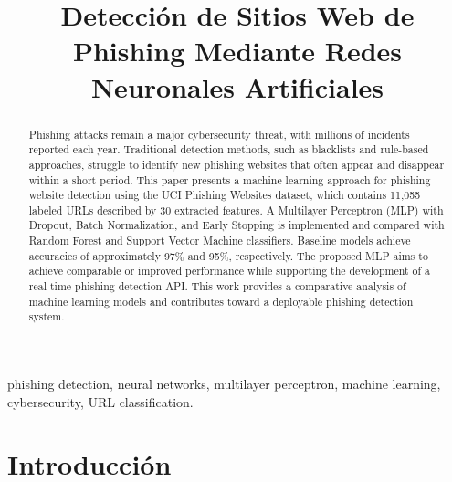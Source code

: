 \documentclass[conference]{IEEEtran}
\begin{document}
\title{Detección de Sitios Web de Phishing Mediante Redes Neuronales Artificiales}

\author{
\and
{}
}

\maketitle

\begin{abstract}
Phishing attacks remain a major cybersecurity threat, with millions of incidents reported each year. Traditional detection methods, such as blacklists and rule-based approaches, struggle to identify new phishing websites that often appear and disappear within a short period. This paper presents a machine learning approach for phishing website detection using the UCI Phishing Websites dataset, which contains 11,055 labeled URLs described by 30 extracted features. A Multilayer Perceptron (MLP) with Dropout, Batch Normalization, and Early Stopping is implemented and compared with Random Forest and Support Vector Machine classifiers. Baseline models achieve accuracies of approximately 97\% and 95\%, respectively. The proposed MLP aims to achieve comparable or improved performance while supporting the development of a real-time phishing detection API. This work provides a comparative analysis of machine learning models and contributes toward a deployable phishing detection system.
\end{abstract}

\begin{IEEEkeywords}
phishing detection, neural networks, multilayer perceptron, machine learning, cybersecurity, URL classification.
\end{IEEEkeywords}

\section{Introducción}
\end{document}
